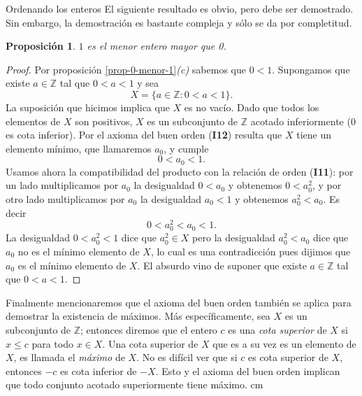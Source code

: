\documentclass[11pt,spanish,makeidx]{amsbook}
\newtheorem{proposicion}[teorema]{Proposici\'on}
\theoremstyle{definition}
\theoremstyle{remark}
\begin{document}
\begin{section}{Ordenando los enteros}
El siguiente resultado es obvio, pero  debe ser demostrado. Sin embargo,  la demostración es bastante compleja y sólo se da por completitud. 
\begin{proposicion}
$1$ es el menor entero mayor que 0.
\end{proposicion}
\begin{proof}
Por proposición \ref{prop-0-menor-1}{\it (c)} sabemos que $0 < 1$. Supongamos que existe $a \in \mathbb Z$ tal que $0<a<1$ y sea 
$$
X=\{a\in\mathbb Z: 0<a<1\}.
$$
La  suposición que hicimos implica que $X$ es no vacío.  Dado que todos los elementos de $X$ son positivos, $X$ es un subconjunto de $\mathbb Z$ acotado inferiormente (0 es cota inferior). Por el axioma del buen orden (\textbf{I12}) resulta que $X$ tiene un elemento mínimo, que llamaremos $a_0$, y cumple
$$
0<a_0<1. 
$$
Usamos ahora la compatibilidad del  producto con  la relación de orden (\textbf{I11}):  por un lado multiplicamos por $a_0$ la desigualdad $0<a_0$ y obtenemos $0<a_0^2$,  y por otro lado multiplicamos por $a_0$ la desigualdad $a_0<1$ y obtenemos $a_0^2<a_0$. Es decir
$$
 0<a_0^2<a_0<1.
$$
La desigualdad $0<a_0^2<1$ dice que $a_0^2\in X$ pero la desigualdad $a_0^2<a_0$ dice que  $a_0$ no es el mínimo elemento de $X$, lo cual es una contradicción pues dijimos que $a_0$ es el mínimo elemento de $X$.  El  absurdo  vino de suponer que existe $a \in \mathbb Z$ tal que   $0<a<1$.
\end{proof}

Finalmente mencionaremos que el axioma del buen orden también se aplica para demostrar la existencia de máximos. Más específicamente, sea $X$ es un subconjunto de $\mathbb Z$; entonces diremos que el entero $c$ es una {\em cota superior} de $X$ si $x\le c$  para todo $x \in X$. Una cota superior de  $X$ que es a su vez es un elemento de $X$, es llamada el {\em máximo} de $X$. 
No es difícil ver que si $c$ es cota superior de  $X$,  entonces $-c$ es cota inferior de $-X$. Esto  y el axioma del buen orden implican que todo conjunto acotado superiormente tiene máximo.  
 cm


\end{section}
\end{document}
